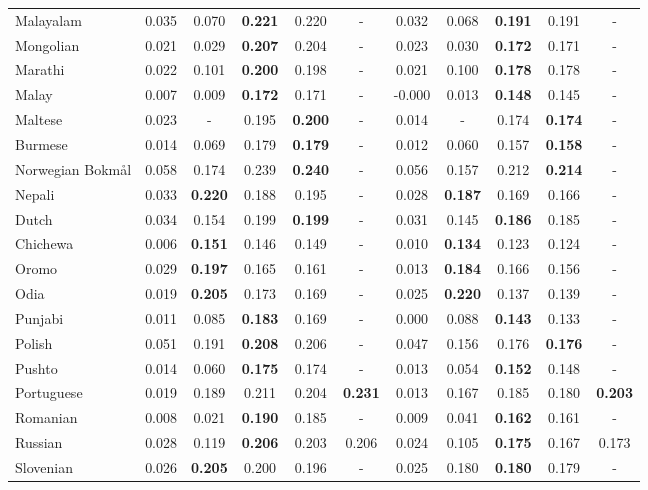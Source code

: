 \begin{longtable}{lcccccccccc}
Malayalam & 0.035 & 0.070 & \textbf{0.221} & 0.220 & - & 0.032 & 0.068 & \textbf{0.191} & 0.191 & - \\
Mongolian & 0.021 & 0.029 & \textbf{0.207} & 0.204 & - & 0.023 & 0.030 & \textbf{0.172} & 0.171 & - \\
Marathi & 0.022 & 0.101 & \textbf{0.200} & 0.198 & - & 0.021 & 0.100 & \textbf{0.178} & 0.178 & - \\
Malay & 0.007 & 0.009 & \textbf{0.172} & 0.171 & - & -0.000 & 0.013 & \textbf{0.148} & 0.145 & - \\
Maltese & 0.023 & - & 0.195 & \textbf{0.200} & - & 0.014 & - & 0.174 & \textbf{0.174} & - \\
Burmese & 0.014 & 0.069 & 0.179 & \textbf{0.179} & - & 0.012 & 0.060 & 0.157 & \textbf{0.158} & - \\
Norwegian Bokmål & 0.058 & 0.174 & 0.239 & \textbf{0.240} & - & 0.056 & 0.157 & 0.212 & \textbf{0.214} & - \\
Nepali & 0.033 & \textbf{0.220} & 0.188 & 0.195 & - & 0.028 & \textbf{0.187} & 0.169 & 0.166 & - \\
Dutch & 0.034 & 0.154 & 0.199 & \textbf{0.199} & - & 0.031 & 0.145 & \textbf{0.186} & 0.185 & - \\
Chichewa & 0.006 & \textbf{0.151} & 0.146 & 0.149 & - & 0.010 & \textbf{0.134} & 0.123 & 0.124 & - \\
Oromo & 0.029 & \textbf{0.197} & 0.165 & 0.161 & - & 0.013 & \textbf{0.184} & 0.166 & 0.156 & - \\
Odia & 0.019 & \textbf{0.205} & 0.173 & 0.169 & - & 0.025 & \textbf{0.220} & 0.137 & 0.139 & - \\
Punjabi & 0.011 & 0.085 & \textbf{0.183} & 0.169 & - & 0.000 & 0.088 & \textbf{0.143} & 0.133 & - \\
Polish & 0.051 & 0.191 & \textbf{0.208} & 0.206 & - & 0.047 & 0.156 & 0.176 & \textbf{0.176} & - \\
Pushto & 0.014 & 0.060 & \textbf{0.175} & 0.174 & - & 0.013 & 0.054 & \textbf{0.152} & 0.148 & - \\
Portuguese & 0.019 & 0.189 & 0.211 & 0.204 & \textbf{0.231} & 0.013 & 0.167 & 0.185 & 0.180 & \textbf{0.203} \\
Romanian & 0.008 & 0.021 & \textbf{0.190} & 0.185 & - & 0.009 & 0.041 & \textbf{0.162} & 0.161 & - \\
Russian & 0.028 & 0.119 & \textbf{0.206} & 0.203 & 0.206 & 0.024 & 0.105 & \textbf{0.175} & 0.167 & 0.173 \\
Slovenian & 0.026 & \textbf{0.205} & 0.200 & 0.196 & - & 0.025 & 0.180 & \textbf{0.180} & 0.179 & - \\

\end{longtable}
